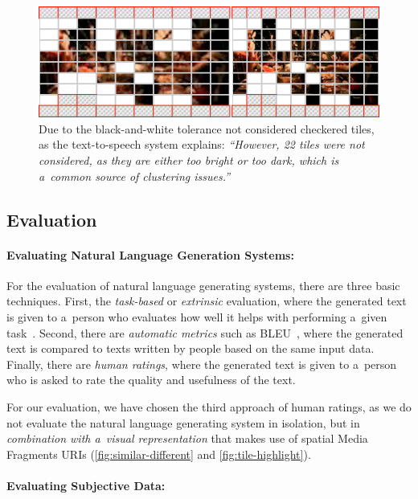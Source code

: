 \begin{figure}[!ht]
  \centering
  \includegraphics[width=0.75\linewidth]{./tile-highlight.png}
  \caption[Due to the black-and-white tolerance not considered checkered tiles]{Due to the black-and-white tolerance not considered checkered tiles, as the text-to-speech system explains: \textit{``However, 22 tiles were not considered, as they are either too bright or too dark, which is a~common source of clustering issues.''}}
  \label{fig:tile-highlight}
\end{figure}

\subsection{Evaluation}
\label{sec:evaluation}

\paragraph{Evaluating Natural Language Generation Systems:}

For the evaluation of natural language generating systems,
there are three basic techniques.
First, the \emph{task-based} or \emph{extrinsic} evaluation,
where the generated text is given to a~person who evaluates
how well it helps with performing a~given task~\cite{portet2009nlg}.
Second, there are \emph{automatic metrics}
such as BLEU~\cite{papineni2002bleu}, where the generated text
is compared to texts written by people based on the same input data.
Finally, there are \emph{human ratings}, where the generated text
is given to a~person who is asked to rate the quality and usefulness of the text.

For our evaluation, we have chosen the third approach of human ratings,
as we do not evaluate the natural language generating system in isolation,
but in \emph{combination with a~visual representation}
that makes use of spatial Media Fragments URIs
(\autoref{fig:similar-different} and \autoref{fig:tile-highlight}).

\paragraph{Evaluating Subjective Data:}

